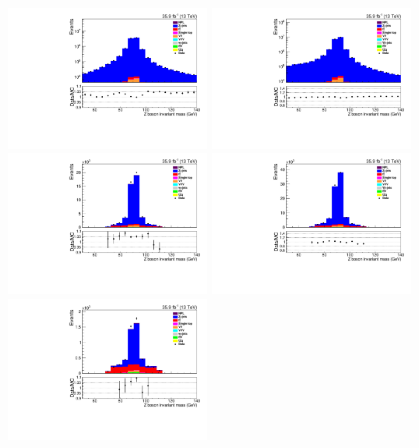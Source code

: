 \begin{figure}[h]
\centering
\includegraphics[width=0.47\textwidth]{figs/background-estimation/plots/unblinded/prompt_ee_ttbarInc/zPairMass_NPL_ee_lepSel_ee_log.pdf}
\includegraphics[width=0.47\textwidth]{figs/background-estimation/plots/unblinded/prompt_mumu_ttbarInc/zPairMass_NPL_mumu_lepSel_mumu_log.pdf}
\\
\includegraphics[width=0.47\textwidth]{figs/background-estimation/plots/unblinded/prompt_ee_ttbarInc/zPairMass_NPL_ee_jetSel_ee.pdf}
\includegraphics[width=0.47\textwidth]{figs/background-estimation/plots/unblinded/prompt_mumu_ttbarInc/zPairMass_NPL_mumu_jetSel_mumu.pdf}
\\
\includegraphics[width=0.47\textwidth]{figs/background-estimation/plots/unblinded/prompt_ee_ttbarInc/zPairMass_NPL_ee_wMass_ee.pdf}

\end{figure}
